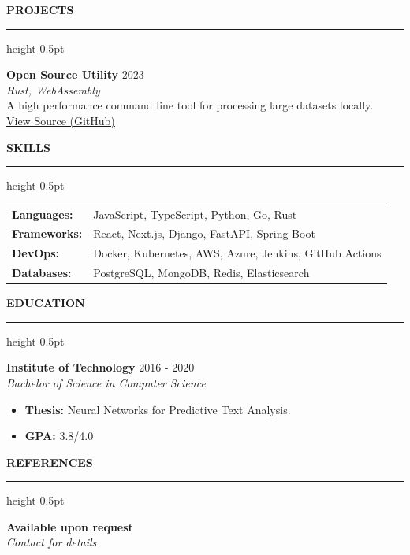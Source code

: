 \documentclass[11pt,a4paper]{article}
\newcommand{\cvsection}[1]{
    \vspace{0.4cm} 
    \noindent
    {\color{mainblack}\textbf{\large \MakeUppercase{#1}}}
    \par
    \vspace{0.1cm}
    {\color{mainblack}\hrule height 0.5pt}
    \vspace{0.2cm} 
}
\newcommand{\jobtitle}[2]{
    \noindent
    \textbf{#1} \hfill {\footnotesize \color{darkgray} #2} \\ 
}
\begin{document}
\cvsection{Projects}

\jobtitle{Open Source Utility}{2023}
\textit{Rust, WebAssembly} \\
A high performance command line tool for processing large datasets locally. \\
\href{https://github.com}{\underline{View Source (GitHub)}}
\vspace{0.3cm}

\cvsection{Skills}
\begin{tabular}{@{}ll}
    \textbf{Languages:} & JavaScript, TypeScript, Python, Go, Rust \\
    \textbf{Frameworks:} & React, Next.js, Django, FastAPI, Spring Boot \\
    \textbf{DevOps:} & Docker, Kubernetes, AWS, Azure, Jenkins, GitHub Actions \\
    \textbf{Databases:} & PostgreSQL, MongoDB, Redis, Elasticsearch
\end{tabular}

\cvsection{Education}

\jobtitle{Institute of Technology}{2016 - 2020}
\textit{Bachelor of Science in Computer Science}
\begin{itemize}[leftmargin=*, label={\small\textbullet}, itemsep=0pt, topsep=2pt]
    \item \textbf{Thesis:} Neural Networks for Predictive Text Analysis.
    \item \textbf{GPA:} 3.8/4.0
\end{itemize}

\cvsection{References}
\jobtitle{Available upon request}{}
\textit{Contact for details}
\end{document}
